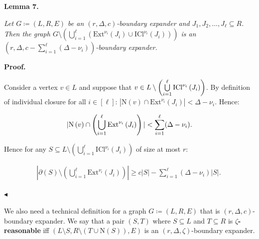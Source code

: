 

\par\medskip\noindent\textbf{
\textbf{Lemma 7}\textbf{.}
}\par



\emph{Let $G\coloneqq(L,R,E)$ be an $(r,\Delta,c)$-boundary expander and $J_{1},J_{2},\dots,J_{\ell}\subseteq R$. Then the graph $G\setminus\left(\bigcup\limits_{i=1}^{\ell}(\mathrm{Ext}^{\nu_{i}}\left(J_{i}%
\right)\cup\mathrm{ICl}^{\nu_{i}}\left(J_{i}\right))\right)$ is an $(r,\Delta,c-\sum\limits_{i=1}^{\ell}(\Delta-\nu_{i}))$-boundary expander.}\par







\par\medskip\noindent\textbf{Proof.}\par




Consider a vertex $v\in L$ and suppose that $v\in L\setminus\left(\bigcup\limits_{i=1}^{\ell}\mathrm{ICl}^{\nu_{i}}\left(J_%
{i}\right)\right)$. By definition of individual closure for all $i\in[\ell]$: $|\mathrm{N}\left(v\right)\cap\mathrm{Ext}^{\nu_{i}}\left(J_{i}\right)|<\Delta-%
\nu_{i}$. Hence:\par


\[\begin{gathered}
|\mathrm{N}\left(v\right)\cap\left(\bigcup\limits_{i=1}^{\ell}\mathrm{Ext}^{%
\nu_{i}}\left(J_{i}\right)\right)|<\sum\limits_{i=1}^{\ell}(\Delta-\nu_{i}).
\end{gathered}\]


Hence for any $S\subseteq L\setminus\left(\bigcup\limits_{i=1}^{\ell}\mathrm{ICl}^{\nu_{i}}%
\left(J_{i}\right)\right)$ of size at most $r$:\par


\[\begin{gathered}
|\partial(S)\setminus\left(\bigcup\limits_{i=1}^{\ell}\mathrm{Ext}^{\nu_{i}}%
\left(J_{i}\right)\right)|\geq c|S|-\sum\limits_{i=1}^{\ell}(\Delta-\nu_{i})|S%
|.\
\end{gathered}\]


$\blacktriangleleft$\par




We also need a technical definition for a graph $G\coloneqq(L,R,E)$ that is $(r,\Delta,c)$-boundary
expander. We say that a pair $(S,T)$ where $S\subseteq L$ and $T\subseteq R$ is
$\zeta$\textbf{-reasonable} iff $(L\setminus S,R\setminus(T\cup\mathrm{N}\left(S\right)),E)$ is an $(r,\Delta,\zeta)$-boundary expander.\par



